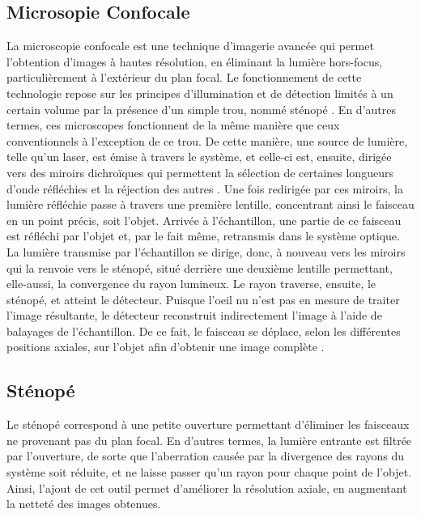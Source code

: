 \documentclass[11pt,letterpaper]{article}
\begin{document}
\subsection{Microsopie Confocale}
La microscopie confocale est une technique d'imagerie avancée qui permet l'obtention d'images à hautes
résolution, en éliminant la lumière hors-focus, particulièrement à l'extérieur du plan focal. Le 
fonctionnement de cette technologie repose sur les principes d'illumination et de détection limités à un 
certain volume par la présence d'un simple trou, nommé sténopé \cite{noauthor_principe_nodate}. En 
d'autres termes, ces microscopes fonctionnent de la même manière que ceux conventionnels à l'exception de
ce trou. De cette manière, une source de lumière, telle qu'un laser, est émise à travers le système, et
celle-ci est, ensuite, dirigée vers des miroirs dichroïques qui permettent la sélection de certaines 
longueurs d'onde réfléchies et la réjection des autres \cite{chineselens_comprehensive_2021}. Une fois
redirigée par ces miroirs, la lumière réfléchie passe à travers une première lentille, concentrant ainsi
le faisceau en un point précis, soit l'objet. Arrivée à l'échantillon, une partie de ce faisceau est
réfléchi par l'objet et, par le fait même, retransmis dans le système optique. La lumière transmise par
l'échantillon se dirige, donc, à nouveau vers les miroirs qui la renvoie vers le sténopé, situé derrière
une deuxième lentille permettant, elle-aussi, la convergence du rayon lumineux. Le rayon traverse,
ensuite, le sténopé, et atteint le détecteur. Puisque l'oeil nu n'est pas en mesure de traiter l'image
résultante, le détecteur reconstruit indirectement l'image à l'aide de balayages de l'échantillon. De 
ce fait, le faisceau se déplace, selon les différentes positions axiales, sur l'objet afin d'obtenir une
image complète \cite{sheehy_experience_2024}.

\subsection{Sténopé}
Le sténopé correspond à une petite ouverture permettant d'éliminer les faisceaux ne provenant pas du 
plan focal. En d'autres termes, la lumière entrante est filtrée par l'ouverture, de sorte que 
l'aberration causée par la divergence des rayons du système soit réduite, et ne laisse passer qu'un 
rayon pour chaque point de l'objet. Ainsi, l'ajout de cet outil permet d'améliorer la résolution axiale, 
en augmentant la netteté des images obtenues.
\end{document}
